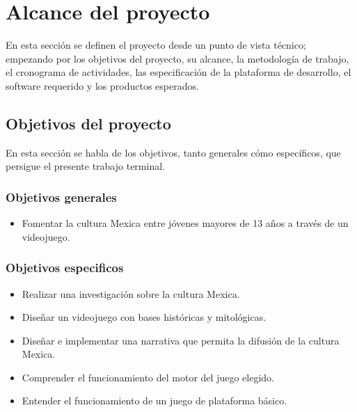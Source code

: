 \chapter{Alcance del proyecto}
En esta sección se definen el proyecto desde un punto de vista técnico; empezando 
por los objetivos del proyecto, su alcance, la metodología de trabajo, 
el cronograma de actividades, las especificación de la plataforma de desarrollo, 
el software requerido y los productos esperados. 
\section{Objetivos del proyecto} \label{Sec_ObjetivosPro}
En esta sección se habla de los objetivos, tanto generales cómo específicos, que persigue el presente trabajo terminal.
	\subsection{Objetivos generales}\label{Sec_ObjetivosGen}		
		\begin{itemize}
			\item Fomentar la cultura Mexica entre jóvenes mayores de 13 años a través de un videojuego.
		\end{itemize}
		
	\subsection{Objetivos especificos} \label{Sec_ObjetivosEsp}
		\begin{itemize}
			\item Realizar una investigación sobre la cultura Mexica.
			\item Diseñar un videojuego con bases históricas y mitológicas.
			\item Diseñar e implementar una narrativa que permita la difusión de la cultura Mexica. 
			\item Comprender el funcionamiento del motor del juego elegido.
			\item Entender el funcionamiento de un juego de plataforma básico.
		\end{itemize}
		
